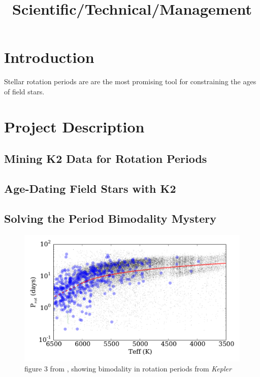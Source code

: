 \documentclass[12pt]{article}
\newcommand{\Kepler}{\textsl{Kepler}\xspace}
\begin{document}


\title{Scientific/Technical/Management}
\date{}

\maketitle


\vspace{-1in}

\section{Introduction}
Stellar rotation periods are are the most promising tool for constraining the ages of field stars.



\section{Project Description}

\subsection{Mining K2 Data for Rotation Periods}


\subsection{Age-Dating Field Stars with K2}


\subsection{Solving the Period Bimodality Mystery}

\begin{figure}[!th]
\centering
\includegraphics[width=4.5in]{davenport2016_fig3}
\caption{figure 3 from \citet{davenport2017}, showing bimodality in rotation periods from \Kepler}
\label{fig:bimodal}
\end{figure}
\end{document}
